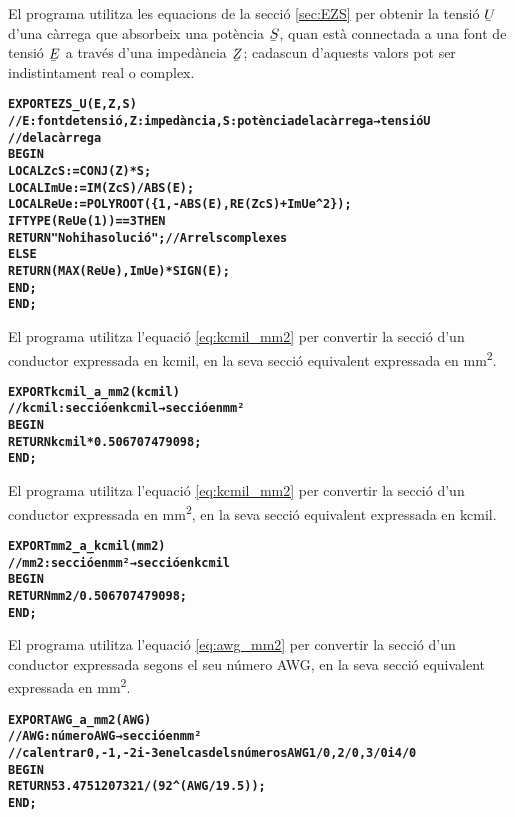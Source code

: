 El programa  utilitza les equacions de la secció \vref{sec:EZS} per obtenir la tensió $\cmplx{U}$ d'una càrrega que absorbeix una potència $\cmplx{S}$, quan està connectada a una font de tensió $\cmplx{E}$ a través d'una impedància $\cmplx{Z}$; cadascun d'aquests valors pot ser indistintament real o complex.
\vspace{-1cm}
\begin{alltt}
\bfseries
{}
    EXPORT EZS_U(E,Z,S)
    // E:font de tensió, Z:impedància, S:potència de la càrrega → tensió U
    // de la càrrega
    BEGIN
      LOCAL ZcS:=CONJ(Z)*S;
      LOCAL ImUe:=IM(ZcS)/ABS(E);
      LOCAL ReUe:=POLYROOT(\{1,-ABS(E),RE(ZcS)+ImUe^2\});
      IF TYPE(ReUe(1))==3 THEN
        RETURN "No hi ha solució"; // Arrels complexes
      ELSE
        RETURN (MAX(ReUe),ImUe)*SIGN(E);
      END;
    END;
\end{alltt}


El programa  utilitza l'equació \eqref{eq:kcmil_mm2} per convertir la secció d'un conductor expressada en \unit{kcmil}, en la seva secció equivalent expressada en \unit{mm^2}.
\vspace{-1cm}
\begin{alltt}
\bfseries
{}
    EXPORT kcmil_a_mm2(kcmil)
    // kcmil:secció en kcmil → secció en mm²
    BEGIN
      RETURN kcmil*0.506707479098;
    END;
\end{alltt}

El programa  utilitza l'equació \eqref{eq:kcmil_mm2} per convertir la secció d'un conductor expressada en \unit{mm^2}, en la seva secció equivalent expressada en \unit{kcmil}.
\vspace{-1cm}
\begin{alltt}
\bfseries
{}
    EXPORT mm2_a_kcmil(mm2)
    // mm2:secció en mm² → secció en kcmil
    BEGIN
      RETURN mm2/0.506707479098;
    END;
\end{alltt}

El programa  utilitza l'equació \eqref{eq:awg_mm2} per convertir la secció d'un conductor expressada segons el seu número AWG, en la seva secció equivalent expressada en \unit{mm^2}.
\vspace{-1cm}
\begin{alltt}
\bfseries
{}
    EXPORT AWG_a_mm2(AWG)
    // AWG:número AWG → secció en mm²
    // cal entrar 0, -1, -2 i -3 en el cas dels números AWG 1/0, 2/0, 3/0 i 4/0
    BEGIN
      RETURN 53.4751207321/(92^(AWG/19.5));
    END;
\end{alltt}

